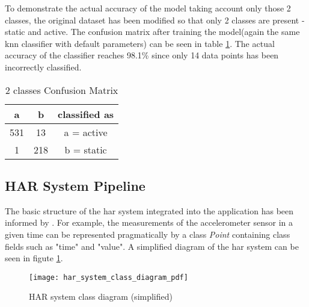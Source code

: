 To demonstrate the actual accuracy of the model taking account only those 2 classes, the original dataset has been modified so that only 2 classes are present - static and active. The confusion matrix after training the model(again the same \gls{knn} classifier with default parameters) can be seen in table \ref{table:2_class_confusion_matrix}. The actual accuracy of the classifier reaches 98.1\% since only 14 data points has been incorrectly classified.

\begin{table}[ht]
\centering
\begin{tabular}{ |c|c|c| } 
 \hline
 a & b & classified as\\
 \hline \hline
  531 & 13 & a = active\\
  1 & 218 & b = static\\
 \hline
\end{tabular}
\caption{2 classes Confusion Matrix}
\label{table:2_class_confusion_matrix}
\end{table}
    
    \subsection{HAR System Pipeline}
    The basic structure of the \gls{har} system integrated into the application has been informed by \citet[149]{labrador2013}. For example, the measurements of the accelerometer sensor in a given time can be represented pragmatically by a class \textit{Point} containing class fields such as "time" and "value". A simplified diagram of the \gls{har} system can be seen in figute \ref{fig:har_system_impl_class_diagram}.
    
    \begin{figure}[ht]
        \centering
        \texttt{[image: har\_system\_class\_diagram\_pdf]}
        \caption{HAR system class diagram (simplified)}
        \label{fig:har_system_impl_class_diagram}
    \end{figure}



    
    
    
    